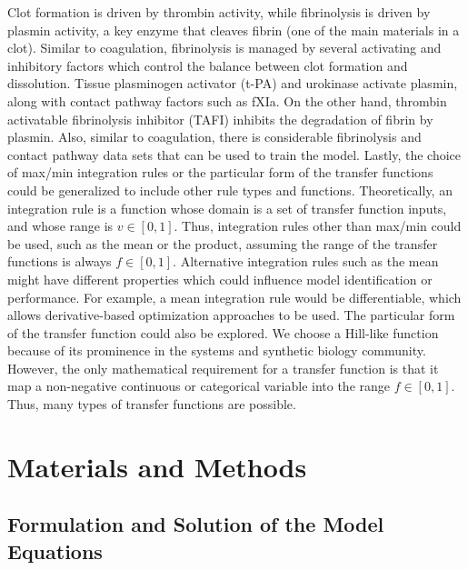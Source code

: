 \documentclass[processes,article,received,moreauthors,pdftex,12pt,a4paper]{mdpi}
\begin{document}
Clot formation is driven by thrombin activity, while fibrinolysis is driven by plasmin activity, a key enzyme that cleaves fibrin (one of the main materials in a clot).
Similar to coagulation, fibrinolysis is managed by several activating and inhibitory factors which control the balance between clot formation and dissolution.
Tissue plasminogen activator (t-PA) and urokinase activate plasmin, along with contact pathway factors such as fXIa. On the other hand, thrombin activatable fibrinolysis inhibitor (TAFI)
inhibits the degradation of fibrin by plasmin. Also, similar to coagulation, there is considerable fibrinolysis and contact pathway data sets that can be used to train the model.
Lastly, the choice of max/min integration rules or the particular form of the transfer functions could be generalized to include other rule types and functions. 
Theoretically, an integration rule is a function whose domain is a set of transfer function inputs, and whose range is $v\in[0,1]$.
Thus, integration rules other than max/min could be used, such as the mean or the product, assuming the range of the transfer functions is always $f\in[0,1]$.
Alternative integration rules such as the mean might have different properties which could influence model identification or performance. 
For example, a mean integration rule would be differentiable, which allows derivative-based optimization approaches to be used. 
The particular form of the transfer function could also be explored. We choose a Hill-like function because of its 
prominence in the systems and synthetic biology community. 
However, the only mathematical requirement for a transfer function is that it map a non-negative continuous or categorical variable into the 
range $f\in[0,1]$. Thus, many types of transfer functions are possible.



\section{Materials and Methods}
\vspace{-12pt}

\subsection{Formulation and Solution of the Model Equations
}
\end{document}
